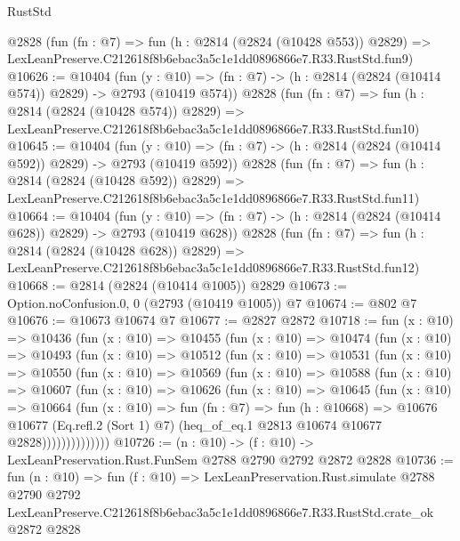 \begin{lexlean}{RustStd}
\begin{coremodule}
    @2828
    (fun (fn : @7) =>
    fun (h : @2814 (@2824 (@10428 @553)) @2829) =>
    LexLeanPreserve.C212618f8b6ebac3a5c1e1dd0896866e7.R33.RustStd.fun9)
@10626 := @10404
    (fun (y : @10) => (fn : @7) -> (h : @2814 (@2824 (@10414 @574)) @2829) -> @2793 (@10419 @574))
    @2828
    (fun (fn : @7) =>
    fun (h : @2814 (@2824 (@10428 @574)) @2829) =>
    LexLeanPreserve.C212618f8b6ebac3a5c1e1dd0896866e7.R33.RustStd.fun10)
@10645 := @10404
    (fun (y : @10) => (fn : @7) -> (h : @2814 (@2824 (@10414 @592)) @2829) -> @2793 (@10419 @592))
    @2828
    (fun (fn : @7) =>
    fun (h : @2814 (@2824 (@10428 @592)) @2829) =>
    LexLeanPreserve.C212618f8b6ebac3a5c1e1dd0896866e7.R33.RustStd.fun11)
@10664 := @10404
    (fun (y : @10) => (fn : @7) -> (h : @2814 (@2824 (@10414 @628)) @2829) -> @2793 (@10419 @628))
    @2828
    (fun (fn : @7) =>
    fun (h : @2814 (@2824 (@10428 @628)) @2829) =>
    LexLeanPreserve.C212618f8b6ebac3a5c1e1dd0896866e7.R33.RustStd.fun12)
@10668 := @2814 (@2824 (@10414 @1005)) @2829
@10673 := Option.noConfusion.{0, 0} (@2793 (@10419 @1005)) @7
@10674 := @802 @7
@10676 := @10673 @10674 @7
@10677 := @2827 @2872
@10718 := fun (x : @10) =>
  @10436
    (fun (x : @10) =>
    @10455
      (fun (x : @10) =>
      @10474
        (fun (x : @10) =>
        @10493
          (fun (x : @10) =>
          @10512
            (fun (x : @10) =>
            @10531
              (fun (x : @10) =>
              @10550
                (fun (x : @10) =>
                @10569
                  (fun (x : @10) =>
                  @10588
                    (fun (x : @10) =>
                    @10607
                      (fun (x : @10) =>
                      @10626
                        (fun (x : @10) =>
                        @10645
                          (fun (x : @10) =>
                          @10664
                            (fun (x : @10) =>
                            fun (fn : @7) =>
                            fun (h : @10668) =>
                            @10676
                              @10677
                              (Eq.refl.{2} (Sort 1) @7)
                              (heq_of_eq.{1} @2813 @10674 @10677 @2828))))))))))))))
@10726 := (n : @10) -> (f : @10) -> LexLeanPreservation.Rust.FunSem @2788 @2790 @2792 @2872 @2828
@10736 := fun (n : @10) =>
  fun (f : @10) =>
  LexLeanPreservation.Rust.simulate
    @2788
    @2790
    @2792
    LexLeanPreserve.C212618f8b6ebac3a5c1e1dd0896866e7.R33.RustStd.crate_ok
    @2872
    @2828
\end{coremodule}
\end{lexlean}
